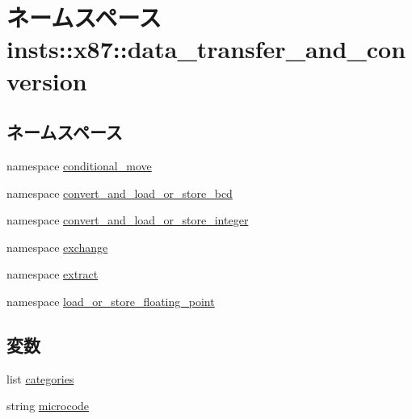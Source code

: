 \hypertarget{namespaceinsts_1_1x87_1_1data__transfer__and__conversion}{
\section{ネームスペース insts::x87::data\_\-transfer\_\-and\_\-conversion}
\label{namespaceinsts_1_1x87_1_1data__transfer__and__conversion}
}
\subsection*{ネームスペース}
\begin{DoxyCompactItemize}
\item 
namespace \hyperlink{namespaceinsts_1_1x87_1_1data__transfer__and__conversion_1_1conditional__move}{conditional\_\-move}
\item 
namespace \hyperlink{namespaceinsts_1_1x87_1_1data__transfer__and__conversion_1_1convert__and__load__or__store__bcd}{convert\_\-and\_\-load\_\-or\_\-store\_\-bcd}
\item 
namespace \hyperlink{namespaceinsts_1_1x87_1_1data__transfer__and__conversion_1_1convert__and__load__or__store__integer}{convert\_\-and\_\-load\_\-or\_\-store\_\-integer}
\item 
namespace \hyperlink{namespaceinsts_1_1x87_1_1data__transfer__and__conversion_1_1exchange}{exchange}
\item 
namespace \hyperlink{namespaceinsts_1_1x87_1_1data__transfer__and__conversion_1_1extract}{extract}
\item 
namespace \hyperlink{namespaceinsts_1_1x87_1_1data__transfer__and__conversion_1_1load__or__store__floating__point}{load\_\-or\_\-store\_\-floating\_\-point}
\end{DoxyCompactItemize}
\subsection*{変数}
\begin{DoxyCompactItemize}
\item 
list \hyperlink{namespaceinsts_1_1x87_1_1data__transfer__and__conversion_a273cf0f1630af14c1582f05e53354a55}{categories}
\item 
string \hyperlink{namespaceinsts_1_1x87_1_1data__transfer__and__conversion_a770f11a173e99389a8802f0107ed8f52}{microcode}
\end{DoxyCompactItemize}



